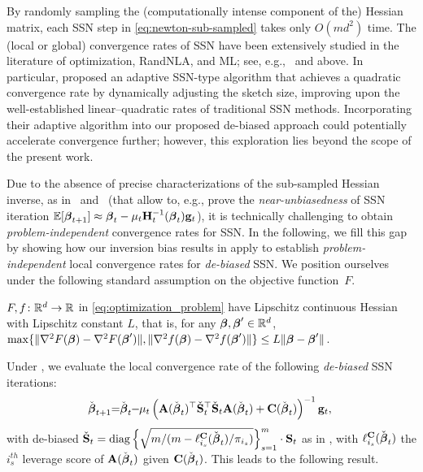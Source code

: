 \documentclass[11pt,a4paper]{article}
\begin{document}
By randomly sampling the (computationally intense component of the) Hessian matrix, each SSN step in \eqref{eq:newton-sub-sampled} takes only $O(md^2)$ time. 
The (local or global) convergence rates of SSN have been extensively studied in the literature of optimization, RandNLA, and ML; see, e.g.,~\citet{xu2016subsampled,bollapragada2019exact,roosta2019subsampled,ye2021approximate,lacotte2021adaptive} and  above.
In particular, \citet{lacotte2021adaptive} proposed an adaptive SSN-type algorithm that achieves a quadratic convergence rate by dynamically adjusting the sketch size, improving upon the well-established linear–quadratic rates of traditional SSN methods.  
Incorporating their adaptive algorithm into our proposed de-biased approach could potentially accelerate convergence further; however, this exploration lies beyond the scope of the present work.

Due to the absence of precise characterizations of the sub-sampled Hessian inverse, as in ~and~ (that allow to, e.g., prove the \emph{near-unbiasedness} of SSN iteration ${\mathbb{E}}[\boldsymbol{\beta}_{t+1}] \approx \boldsymbol{\beta}_t - \mu_t \mathbf{H}_t^{-1}(\boldsymbol{\beta}_{t}) \mathbf{g}_t$), it is technically challenging to obtain \emph{problem-independent} convergence rates for SSN.
In the following, we fill this gap by showing how our inversion bias results in  apply to establish \emph{problem-independent} local convergence rates for \emph{de-biased} SSN.
We position ourselves under the following standard assumption on the objective function~$F$.
\begin{assumption}\label{assum:lip_f}
$F, f \colon {\mathbb{R}}^d\rightarrow {\mathbb{R}}$ in \eqref{eq:optimization_problem} have Lipschitz continuous Hessian with Lipschitz constant $L$, that is, for any $\boldsymbol{\beta}, \boldsymbol{\beta}'\in{\mathbb{R}}^d$, $\max\{ \|\nabla^2F(\boldsymbol{\beta})-\nabla^2F(\boldsymbol{\beta}')\|, \|\nabla^2 f(\boldsymbol{\beta})-\nabla^2 f(\boldsymbol{\beta}')\|\}\leq L \|\boldsymbol{\beta}-\boldsymbol{\beta}'\|$.
\end{assumption}

Under , we evaluate the local convergence rate of the following \emph{de-biased} SSN iterations:
\begin{equation}\label{eq:de_newton-sub-sampled}
  \hspace{-1mm}
  \check{\boldsymbol{\beta}}_{t+1}
  \hspace{-1mm}
  =
  \hspace{-1mm} 
  \check{\boldsymbol{\beta}}_{t}
  \hspace{-1mm}
  -
  \hspace{-1mm}
  \mu_t \left(\mathbf{A}(\check{\boldsymbol{\beta}}_t)^\top \check{\mathbf{S}}_t^\top  \check{\mathbf{S}}_t \mathbf{A}(\check{\boldsymbol{\beta}}_t)+\mathbf{C}(\check{\boldsymbol{\beta}}_t) \right)^{-1}\mathbf{g}_t,
\end{equation}
with de-biased $\check{\mathbf{S}}_t = \operatorname{diag}\Big\{ \sqrt{ m/(m - \ell^{\mathbf{C}}_{i_s}(\check{\boldsymbol{\beta}}_t)/\pi_{i_s} ) } \Big\}_{s=1}^m \cdot \mathbf{S}_t$ as in , with $\ell^{\mathbf{C}}_{i_s}(\check{\boldsymbol{\beta}}_t)$ the $i_s^{th}$ leverage score of $\mathbf{A}(\check{\boldsymbol{\beta}}_t)$ given $\mathbf{C}(\check{\boldsymbol{\beta}}_t)$.
This leads to the following result.
\end{document}
